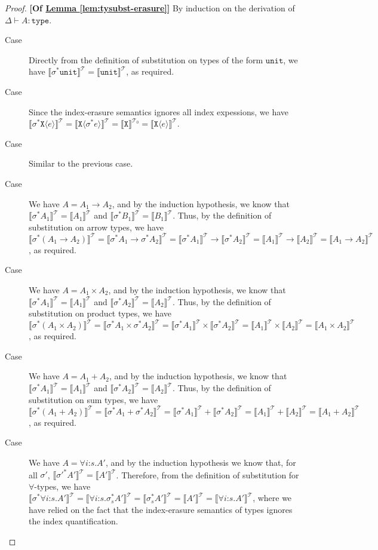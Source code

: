 \documentclass[natbib,preprint]{sigplanconf}
\newcommand{\sortType}{\texttt{type}}
\newcommand{\tyUnit}{\texttt{unit}}
\newcommand{\tyPrim}[2]{\texttt{#1}\langle #2 \rangle}
\newcommand{\tyPrimNm}[1]{\texttt{#1}}
\newcommand{\tyArr}{\to}
\newcommand{\tyProduct}{\times}
\newcommand{\tySem}[1]{\llbracket #1 \rrbracket^{\mathcal{T}}}
\newcommand{\tyPrimSem}[1]{\llbracket \tyPrimNm{#1} \rrbracket^{\mathcal{T}_0}}
\newcommand{\lemref}[1]{\hyperref[#1]{Lemma \ref*{#1}}}
\begin{document}
\begin{proof}\textbf{[Of \lemref{lem:tysubst-erasure}]}
  By induction on the derivation of $\Delta \vdash A : \sortType$.
  \begin{description}
  \item[Case ] Directly from the definition of
    substitution on types of the form $\tyUnit$, we have
    $\tySem{\sigma^*\tyUnit} = \tySem{\tyUnit}$, as required.
  \item[Case ] Since the index-erasure semantics
    ignores all index expessions, we have
    $\tySem{\sigma^*\tyPrim{X}{e}} = \tySem{\tyPrim{X}{\sigma^*e}} =
    \tyPrimSem{X} = \tySem{\tyPrim{X}{e}}$.
  \item[Case ] Similar to the previous case.
  \item[Case ] We have $A = A_1 \tyArr A_2$, and by the
    induction hypothesis, we know that $\tySem{\sigma^*A_1} =
    \tySem{A_1}$ and $\tySem{\sigma^*B_1} = \tySem{B_1}$. Thus, by the
    definition of substitution on arrow types, we have
    $\tySem{\sigma^*(A_1 \tyArr A_2)} = \tySem{\sigma^*A_1 \tyArr
      \sigma^*A_2} = \tySem{\sigma^*A_1} \to \tySem{\sigma^*A_2} =
    \tySem{A_1} \to \tySem{A_2} = \tySem{A_1 \tyArr A_2}$, as
    required.
  \item[Case ] We have $A = A_1 \tyProduct A_2$, and
    by the induction hypothesis, we know that $\tySem{\sigma^*A_1} =
    \tySem{A_1}$ and $\tySem{\sigma^*A_2} = \tySem{A_2}$. Thus, by the
    definition of substitution on product types, we have
    $\tySem{\sigma^*(A_1 \tyProduct A_2)} = \tySem{\sigma^*A_1
      \tyProduct \sigma^*A_2} = \tySem{\sigma^*A_1} \times
    \tySem{\sigma^*A_2} = \tySem{A_1} \times \tySem{A_2} = \tySem{A_1
      \tyProduct A_2}$, as required.
  \item[Case ] We have $A = A_1 + A_2$, and by the
    induction hypothesis, we know that $\tySem{\sigma^*A_1} =
    \tySem{A_1}$ and $\tySem{\sigma^*A_2} = \tySem{A_2}$. Thus, by the
    definition of substitution on sum types, we have
    $\tySem{\sigma^*(A_1 + A_2)} = \tySem{\sigma^*A_1 + \sigma^*A_2} =
    \tySem{\sigma^*A_1} + \tySem{\sigma^*A_2} = \tySem{A_1} +
    \tySem{A_2} = \tySem{A_1 + A_2}$, as required.
  \item[Case ] We have $A = \forall i\mathord:s.A'$,
    and by the induction hypothesis we know that, for all $\sigma'$,
    $\tySem{\sigma'^*A'} = \tySem{A'}$. Therefore, from the definition
    of substitution for $\forall$-types, we have
    $\tySem{\sigma^*\forall i\mathord:s.A'} = \tySem{\forall
      i\mathord:s.\sigma_s^{*}A'} = \tySem{\sigma_s^{*}A'} = \tySem{A'}
    = \tySem{\forall i\mathord:s.A'}$, where we have relied on the
    fact that the index-erasure semantics of types ignores the index
    quantification.
  \end{description}
\end{proof}
\end{document}
